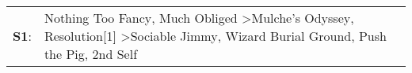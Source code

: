 \begin{supertabular}{p{0.03\textwidth}p{0.92\textwidth}}
 \textbf{S1}:  &  Nothing Too Fancy\textsuperscript{}, \enspace Much Obliged\textsuperscript{} \textgreater \enspace Mulche's Odyssey\textsuperscript{}, \enspace Resolution[1]\textsuperscript{} \textgreater \enspace Sociable Jimmy\textsuperscript{}, \enspace Wizard Burial Ground\textsuperscript{}, \enspace Push the Pig\textsuperscript{}, \enspace 2nd Self\textsuperscript{}  \enspace  \\
\end{supertabular}
